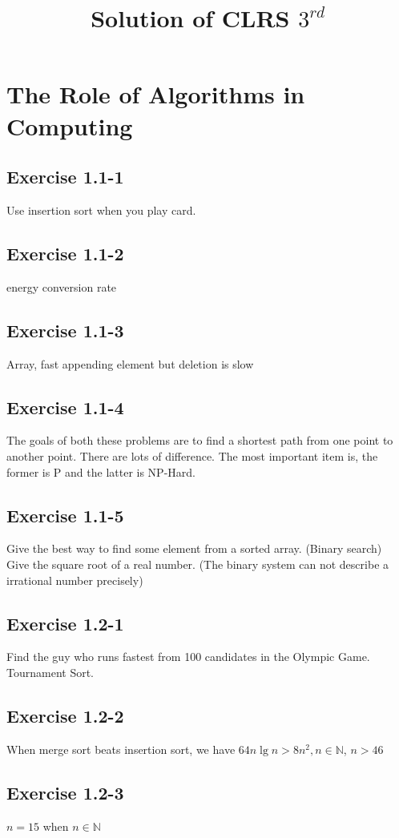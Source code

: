 \documentclass[12pt]{article}
\theoremstyle{definition}
\theoremstyle{remark}
\begin{document}
\title{Solution of CLRS $3^{rd}$}%
\maketitle
\section{The Role of Algorithms in Computing}
\subsection*{Exercise 1.1-1}
Use insertion sort when you play card.
\subsection*{Exercise 1.1-2}
energy conversion rate
\subsection*{Exercise 1.1-3}
Array, fast appending element but deletion is slow
\subsection*{Exercise 1.1-4}
The goals of both these problems are to find a shortest path from one point to another point. There are lots of difference. The most important item is, the former is P and the latter is NP-Hard.
\subsection*{Exercise 1.1-5}
Give the best way to find some element from a sorted array. (Binary search)\\
Give the square root of a real number. (The binary system can not describe a irrational number precisely)
\subsection*{Exercise 1.2-1}
Find the guy who runs fastest from 100 candidates in the Olympic Game. Tournament Sort.
\subsection*{Exercise 1.2-2}
When merge sort beats insertion sort, we have $64n\lg{n}>8n^2,n\in \mathbb{N}$, $n>46$
\subsection*{Exercise 1.2-3}
$n = 15$ when $n\in \mathbb{N}$
\end{document}
